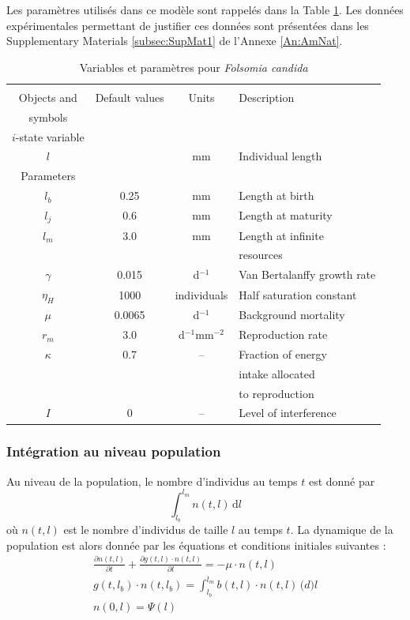 Les paramètres utilisés dans ce modèle sont rappelés dans la Table
\ref{tab:ANparam}. Les données expérimentales permettant de justifier ces
données sont présentées dans les Supplementary Materials \ref{subsec:SupMat1} de
l'Annexe \ref{An:AmNat}. 

\begin{table}
\caption{\label{tab:ANparam}Variables et paramètres pour \textit{Folsomia
candida}}
\begin{tabular}{cccl}
\hline
\hline 
 & & &\\
 Objects and  & Default values & Units & Description\\ 
symbols & & &\\
\hline
	$i$-state variable & & & \\ 
	$l$ &   & mm & Individual length \\ 
	Parameters & & & \\ 
	$l_{b}$ & 0.25 & mm & Length at birth \\ 
	$l_{j}$ & 0.6 & mm & Length at maturity \\ 
	$l_{m}$ & 3.0 & mm & Length at infinite\\
	& & &  resources \\ 
	$\gamma$ & 0.015 & d$^{-1}$ & Van Bertalanffy growth rate \\ 
	$\eta_{H}$ & 1000 & individuals & Half saturation constant \\ 
	$\mu$ & 0.0065 & d$^{-1}$ & Background mortality \\ 
	$r_{m}$ & 3.0 & d$^{-1}$mm$^{-2}$ & Reproduction rate \\ 
	$\kappa$ & 0.7 & -- & Fraction of energy \\
	  &   &   & intake allocated \\
	  &   &   & to reproduction \\ 
	  $I$ & 0 & -- & Level of interference\\
\hline 
\end{tabular} 
\end{table}

\subsubsection{Intégration au niveau population}

Au niveau de la population, le nombre d'individus au temps $t$ est donné par
\begin{equation}
\label{eq_an5}
\int_{l_b}^{l_m}\!n(t,l)\,\mathrm{d}l
\end{equation}
où $n(t,l)$ est le nombre d'individus de taille $l$ au temps $t$. La dynamique
de la population est alors donnée par les équations et conditions initiales
suivantes \autocites{kooijman1984a,de-roos1997a}:
\begin{align}
\label{eq_an6}
\frac{\partial n(t,l)}{\partial t}+\frac{\partial g(t,l) \cdot n(t,l)}{\partial l}=-\mu \cdot n(t,l) \\
g(t,l_b) \cdot n(t,l_b)= \int_{l_b} ^{l_m} \! b(t,l)\cdot n(t,l)\, \mathrm(d)l
\\ n(0,l)=\Psi(l)
\end{align}

